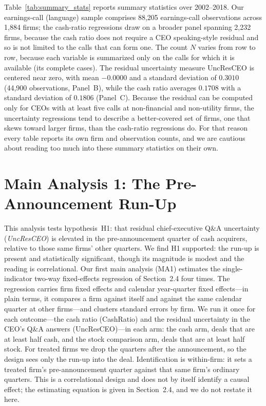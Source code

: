Table~\ref{tab:summary_stats} reports summary statistics over 2002--2018. Our earnings-call (language) sample comprises 88,205 earnings-call observations across 1,884 firms; the cash-ratio regressions draw on a broader panel spanning 2,232 firms, because the cash ratio does not require a CEO speaking-style residual and so is not limited to the calls that can form one. The count $N$ varies from row to row, because each variable is summarized only on the calls for which it is available (its complete cases). The residual uncertainty measure UncResCEO is centered near zero, with mean $-0.0000$ and a standard deviation of $0.3010$ (44,900 observations, Panel~B), while the cash ratio averages $0.1708$ with a standard deviation of $0.1806$ (Panel~C). Because the residual can be computed only for CEOs with at least five calls at non-financial and non-utility firms, the uncertainty regressions tend to describe a better-covered set of firms, one that skews toward larger firms, than the cash-ratio regressions do. For that reason every table reports its own firm and observation counts, and we are cautious about reading too much into these summary statistics on their own.

\section{Main Analysis 1: The Pre-Announcement Run-Up}

This analysis tests hypothesis~H1: that residual chief-executive Q\&A uncertainty (\textit{UncResCEO}) is elevated in the pre-announcement quarter of cash acquirers, relative to those same firms' other quarters. We find H1 supported: the run-up is present and statistically significant, though its magnitude is modest and the reading is correlational. Our first main analysis (MA1) estimates the single-indicator two-way fixed-effects regression of Section~2.4 four times. The regression carries firm fixed effects and calendar year-quarter fixed effects---in plain terms, it compares a firm against itself and against the same calendar quarter at other firms---and clusters standard errors by firm. We run it once for each outcome---the cash ratio (CashRatio) and the residual uncertainty in the CEO's Q\&A answers (UncResCEO)---in each arm: the cash arm, deals that are at least half cash, and the stock comparison arm, deals that are at least half stock. For treated firms we drop the quarters after the announcement, so the design sees only the run-up into the deal. Identification is within-firm: it sets a treated firm's pre-announcement quarter against that same firm's ordinary quarters. This is a correlational design and does not by itself identify a causal effect; the estimating equation is given in Section~2.4, and we do not restate it here.

